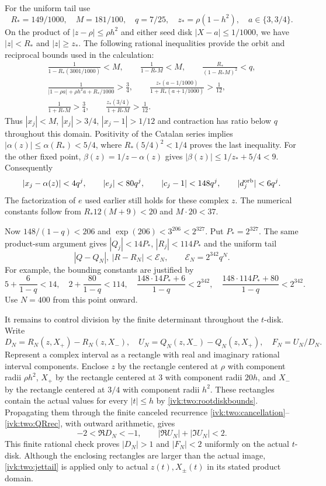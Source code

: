 \documentclass[11pt,letterpaper]{article}
\theoremstyle{remark}\newtheorem{remark}[theorem]{Remark}
\begin{document}
For the uniform tail use
\[
 R_* =149/1000,\quad M=181/100,\quad q=7/25,\quad
 z_*=\rho(1-h^2),\quad a\in\{3,3/4\}.
\]
On the product of $|z-\rho|\le\rho h^2$ and either seed disk
$|X-a|\le1/1000$, we have $|z|<R_*$ and $|z|\ge z_*$.
The following rational inequalities provide the orbit and reciprocal
bounds used in the calculation:
\begin{equation}\label{ivk:two:jetorbitbounds}
\begin{gathered}
 \frac1{1-R_*(3001/1000)}<M,\qquad
 \frac1{1-R_*M}<M,\qquad
 \frac{R_*}{(1-R_*M)^2}<q,\\
 \frac1{|1-\rho a|+\rho h^2a+R_*/1000}>\frac34,\qquad
 \frac{z_*(a-1/1000)}{1+R_*(a+1/1000)}>\frac1{12},\\
 \frac1{1+R_*M}>\frac34,\qquad
 \frac{z_*(3/4)}{1+R_*M}>\frac1{12}.
\end{gathered}
\end{equation}
Thus $|x_j|<M$, $|x_j|>3/4$, $|x_j-1|>1/12$ and contraction
has ratio below $q$ throughout this domain. Positivity of the Catalan
series implies $|\alpha(z)|\le\alpha(R_*)<5/4$, where
$R_*(5/4)^2<1/4$ proves the last inequality. For the other fixed
point, $\beta(z)=1/z-\alpha(z)$ gives
$|\beta(z)|\le1/z_*+5/4<9$. Consequently
\[
 |x_j-\alpha(z)|<4q^j,\qquad
 |e_j|<80q^j,\qquad |c_j-1|<148q^j,\qquad
 |d_j^{\rm orb}|<6q^j.
\]
The factorization of $e$ used earlier still holds for these complex
$z$. The numerical constants follow from
$R_*12(M+9)<20$ and $M\cdot20<37$.

Now $148/(1-q)<206$ and $\exp(206)<3^{206}<2^{327}$.
Put $P_*=2^{327}$. The same product-sum argument gives
$|Q_j|<14P_*$, $|R_j|<114P_*$ and the uniform tail
\begin{equation}\label{ivk:two:jettail}
 |Q-Q_N|,\ |R-R_N|<\mathcal E_N,
 \qquad \mathcal E_N=2^{342}q^N.
\end{equation}
For example, the bounding constants are justified by
\[
 5+\frac6{1-q}<14,\quad 2+\frac{80}{1-q}<114,\quad
 \frac{148\cdot14P_*+6}{1-q}<2^{342},\quad
 \frac{148\cdot114P_*+80}{1-q}<2^{342}.
\]
Use $N=400$ from this point onward.

It remains to control division by the finite determinant throughout
the $t$-disk. Write
\[
 D_N=R_N(z,X_+)-R_N(z,X_-),\quad
 U_N=Q_N(z,X_-)-Q_N(z,X_+),\quad F_N=U_N/D_N.
\]
Represent a complex interval as a rectangle with real and imaginary
rational interval components. Enclose $z$ by the rectangle centered at
$\rho$ with component radii $\rho h^2$, $X_+$ by the rectangle
centered at $3$ with component radii $20h$, and $X_-$ by the rectangle
centered at $3/4$ with component radii $h^2$. These rectangles contain
the actual values for every $|t|\le h$ by \eqref{ivk:two:rootdiskbounds}.
Propagating them through the finite canceled recurrence
\eqref{ivk:two:cancellation}--\eqref{ivk:two:QRrec}, with outward arithmetic, gives
\begin{equation}\label{ivk:two:boxcertificate}
 -2<\Re D_N<-1,\qquad
 |\Re U_N|+|\Im U_N|<2.
\end{equation}
This finite rational check proves $|D_N|>1$ and $|F_N|<2$ uniformly
on the actual $t$-disk. Although the enclosing rectangles are larger
than the actual image, \eqref{ivk:two:jettail} is applied only to actual
$z(t),X_\pm(t)$ in its stated product domain.
\end{document}

